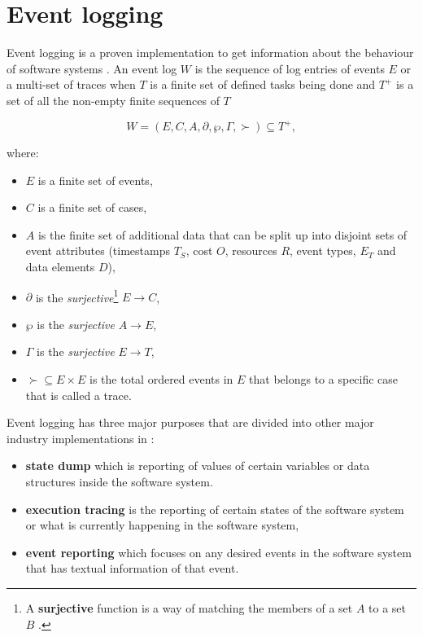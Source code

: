 \clearpage

\section{Event logging}\label{sec:ch1_eventLogging}
Event logging is a proven implementation to get information about the behaviour of software systems \cite{Baccanico2014}. An event log $W$ is the sequence of log entries of events $E$ or a multi-set of traces when $T$ is a finite set of defined tasks being done and $T^+$ is a set of all the non-empty finite sequences of $T$ \cite{Kherbouche2017}

\begin{equation}
	\label{eq:LogEvent}
	W = (E, C, A, \partial, \wp, \Gamma, \succ) \subseteq T^+,
\end{equation}

where:

\begin{itemize}
	\item $E$ is a finite set of events,
	\item $C$ is a finite set of cases,
	\item $A$ is the finite set of additional data that can be split up into disjoint sets of event attributes (timestamps $T_S$, cost $O$, resources $R$, event types, $E_T$ and data elements $D$),
	\item $\partial$ is the \textit{surjective}\footnote{\label{ftn:Surjective}A \textbf{surjective} function is a way of matching the members of a set $A$ to a set $B$ \cite{Szendrei1990}.} $E\rightarrow C$,
	\item $\wp$ is the \textit{surjective} $A\rightarrow E$,
	\item $\Gamma$ is the \textit{surjective} $E\rightarrow T$,
	\item $\succ \subseteq E\times E$ is the total ordered events in $E$ that belongs to a specific case that is called a trace.
\end{itemize}


Event logging has three major purposes that are divided into other major industry implementations in  \cite{Pecchia2015}:

\begin{itemize}
	\item \textbf{state dump} which is reporting of values of certain variables or data structures inside the software system.
	\item \textbf{execution tracing} is the reporting of certain states of the software system or what is currently happening in the software system,
	\item \textbf{event reporting} which focuses on any desired events in the software system that has textual information of that event.
\end{itemize}

